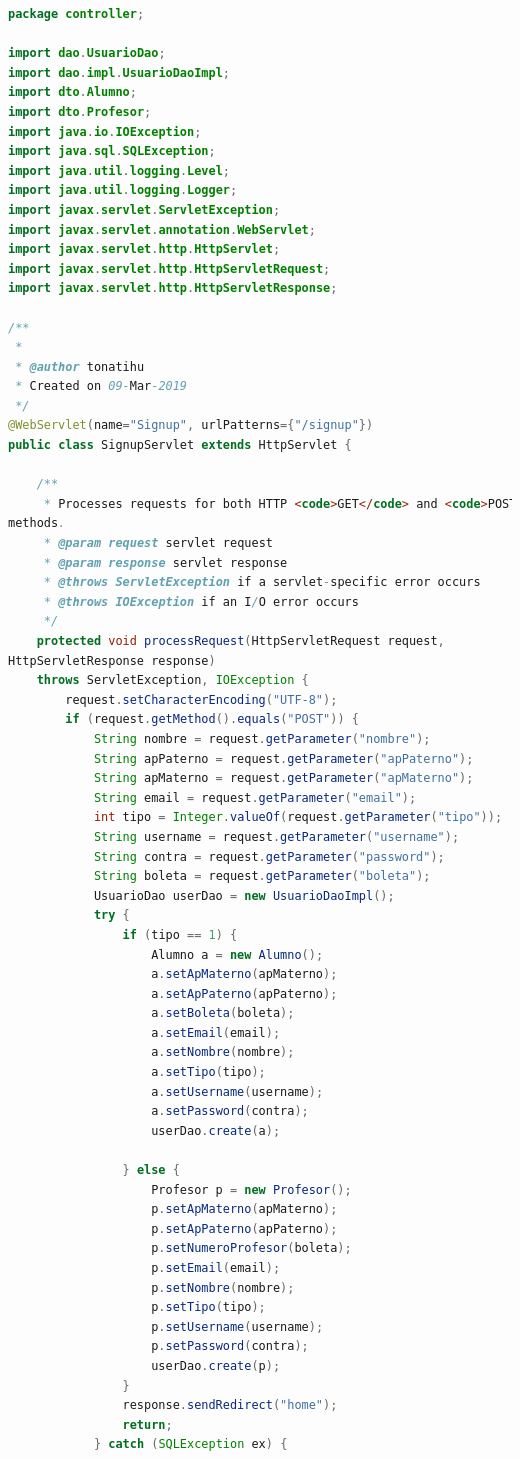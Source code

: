 \documentclass[a4paper,12pt]{article}
\begin{document}
\begin{lstlisting}[language=Java, style=customJava, 
caption={SignupServlet.java}, captionpos=b,basicstyle=\fontfamily{cmss}\small]
package controller;

import dao.UsuarioDao;
import dao.impl.UsuarioDaoImpl;
import dto.Alumno;
import dto.Profesor;
import java.io.IOException;
import java.sql.SQLException;
import java.util.logging.Level;
import java.util.logging.Logger;
import javax.servlet.ServletException;
import javax.servlet.annotation.WebServlet;
import javax.servlet.http.HttpServlet;
import javax.servlet.http.HttpServletRequest;
import javax.servlet.http.HttpServletResponse;

/**
 *
 * @author tonatihu
 * Created on 09-Mar-2019
 */
@WebServlet(name="Signup", urlPatterns={"/signup"})
public class SignupServlet extends HttpServlet {
   
    /** 
     * Processes requests for both HTTP <code>GET</code> and <code>POST</code> 
methods.
     * @param request servlet request
     * @param response servlet response
     * @throws ServletException if a servlet-specific error occurs
     * @throws IOException if an I/O error occurs
     */
    protected void processRequest(HttpServletRequest request, 
HttpServletResponse response)
    throws ServletException, IOException {
        request.setCharacterEncoding("UTF-8");
        if (request.getMethod().equals("POST")) {
            String nombre = request.getParameter("nombre");
            String apPaterno = request.getParameter("apPaterno");
            String apMaterno = request.getParameter("apMaterno");
            String email = request.getParameter("email");
            int tipo = Integer.valueOf(request.getParameter("tipo"));
            String username = request.getParameter("username");
            String contra = request.getParameter("password");
            String boleta = request.getParameter("boleta");
            UsuarioDao userDao = new UsuarioDaoImpl();
            try {
                if (tipo == 1) {
                    Alumno a = new Alumno();
                    a.setApMaterno(apMaterno);
                    a.setApPaterno(apPaterno);
                    a.setBoleta(boleta);
                    a.setEmail(email);
                    a.setNombre(nombre);
                    a.setTipo(tipo);
                    a.setUsername(username);
                    a.setPassword(contra);
                    userDao.create(a);

                } else {
                    Profesor p = new Profesor();
                    p.setApMaterno(apMaterno);
                    p.setApPaterno(apPaterno);
                    p.setNumeroProfesor(boleta);
                    p.setEmail(email);
                    p.setNombre(nombre);
                    p.setTipo(tipo);
                    p.setUsername(username);
                    p.setPassword(contra);
                    userDao.create(p);
                }
                response.sendRedirect("home");
                return;
            } catch (SQLException ex) {
                

\end{lstlisting}
\end{document}
